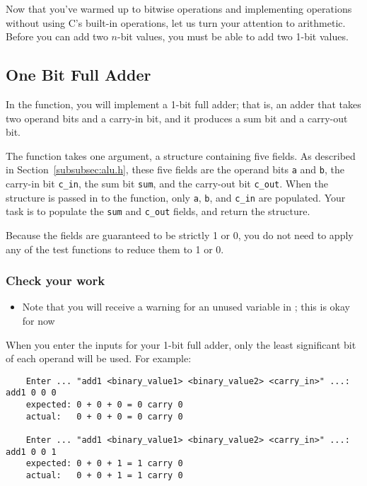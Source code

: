 Now that you've warmed up to bitwise operations and implementing operations without using C's built-in operations, let us turn your attention to arithmetic.
Before you can add two $n$-bit values, you must be able to add two 1-bit values.

\subsection{One Bit Full Adder} \label{subsec:one-bit-full-adder}

In the  function, you will implement a 1-bit full adder;
that is, an adder that takes two operand bits and a carry-in bit, and it produces a sum bit and a carry-out bit.

The function takes one argument, a structure containing five fields.
As described in Section~\ref{subsubsec:alu.h}, these five fields are the operand bits \lstinline{a} and \lstinline{b}, the carry-in bit \lstinline{c_in}, the sum bit \lstinline{sum}, and the carry-out bit \lstinline{c_out}.
When the structure is passed in to the function, only \lstinline{a}, \lstinline{b}, and \lstinline{c_in} are populated.
Your task is to populate the \lstinline{sum} and \lstinline{c_out} fields, and return the structure.

\begin{description}
\end{description}
Because the fields are guaranteed to be strictly 1 or 0, you do not need to apply any of the test functions to reduce them to 1 or 0.

\subsubsection*{Check your work}

\begin{description}
    \begin{itemize}
        \item Note that you will receive a warning for an unused variable in ;
            this is okay for now
    \end{itemize}
\end{description}
When you enter the inputs for your 1-bit full adder, only the least significant bit of each operand will be used.
For example:
\begin{verbatim}
    Enter ... "add1 <binary_value1> <binary_value2> <carry_in>" ...: add1 0 0 0
    expected: 0 + 0 + 0 = 0 carry 0
    actual:   0 + 0 + 0 = 0 carry 0

    Enter ... "add1 <binary_value1> <binary_value2> <carry_in>" ...: add1 0 0 1
    expected: 0 + 0 + 1 = 1 carry 0
    actual:   0 + 0 + 1 = 1 carry 0
\end{verbatim}

